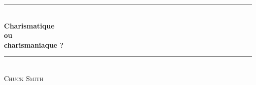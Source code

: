 \newcommand{\HRule}{\rule{\linewidth}{0.5mm}}

\pagestyle{empty}

\begin{titlepage}
\begin{center}
\mbox{}
\vfill
\HRule \\[0.4cm]
{ \LARGE \bfseries Charismatique\\ ou\\ \og charismaniaque \fg{}?}\\[0.4cm]

\HRule \\[1.5cm]
\textsc{\Large Chuck Smith}\\[1.5cm]
\vfill
\mbox{}
\end{center}
\end{titlepage}

